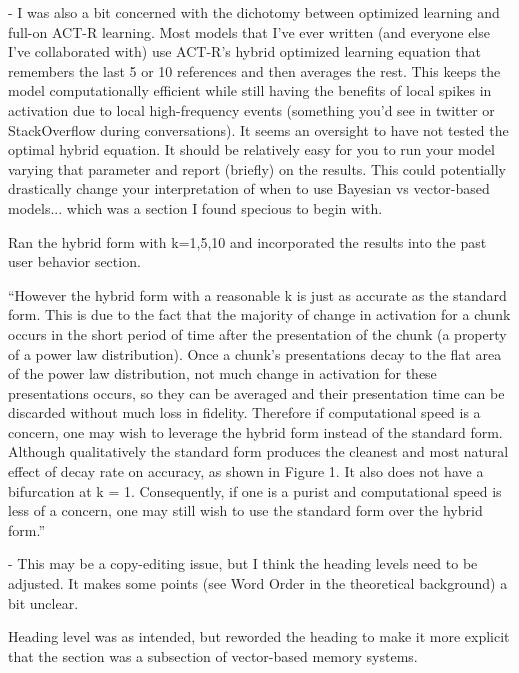 \documentclass[answers,12pt]{exam}
\begin{document}
\begin{questions}
\begin{solution}
\end{solution}

\question - I was also a bit concerned with the dichotomy between optimized learning and full-on ACT-R learning. Most models that I've ever written (and everyone else I've collaborated with) use ACT-R's hybrid optimized learning equation that remembers the last 5 or 10 references and then averages the rest. This keeps the model computationally efficient while still having the benefits of local spikes in activation due to local high-frequency events (something you'd see in twitter or StackOverflow during conversations). It seems an oversight to have not tested the optimal hybrid equation. It should be relatively easy for you to run your model varying that parameter and report (briefly) on the results. This could potentially drastically change your interpretation of when to use Bayesian vs vector-based models... which was a section I found specious to begin with.

\begin{solution}
Ran the hybrid form with k=1,5,10 and incorporated the results into the past user behavior section.

``However the hybrid form with a reasonable k is just as accurate as the standard form. This is due to the fact that the majority of change in activation for a chunk occurs in the short period of time after the presentation of the chunk (a property of a power law distribution). Once a chunk's presentations decay to the flat area of the power law distribution, not much change in activation for these presentations occurs, so they can be averaged and their presentation time can be discarded without much loss in fidelity. Therefore if computational speed is a concern, one may wish to leverage the hybrid form instead of the standard form. Although qualitatively the standard form produces the cleanest and most natural effect of decay rate on accuracy, as shown in Figure 1. It also does not have a bifurcation at k = 1. Consequently, if one is a purist and computational speed is less of a concern, one may still wish to use the standard form over the hybrid form.''

\end{solution}

\question - This may be a copy-editing issue, but I think the heading levels need to be adjusted. It makes some points (see Word Order in the theoretical background) a bit unclear.

\begin{solution}
Heading level was as intended, but reworded the heading to make it more explicit that the section was a subsection of vector-based memory systems.
\end{solution}


\end{questions}
\end{document}
